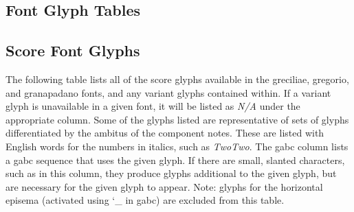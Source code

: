 %
%
%
%
%
%
\begin{landscape}

\section{Font Glyph Tables}\label{glyphtable}

\subsection{Score Font Glyphs}

The following table lists all of the score glyphs available in the greciliae,
gregorio, and granapadano fonts, and any variant glyphs contained within.  If a
variant glyph is unavailable in a given font, it will be listed as
{\itshape\small N/A} under the appropriate column.  Some of the glyphs listed
are representative of sets of glyphs differentiated by the ambitus of the
component notes.  These are listed with English words for the numbers in
italics, such as {\itshape TwoTwo}.  The gabc column lists a gabc sequence that
uses the given glyph.  If there are small, slanted characters, such as
 in this column, they produce glyphs additional to the given
glyph, but are necessary for the given glyph to appear.  Note: glyphs for the
horizontal episema (activated using {\ttfamily\char`_} in gabc) are excluded from
this table.


\end{landscape}
